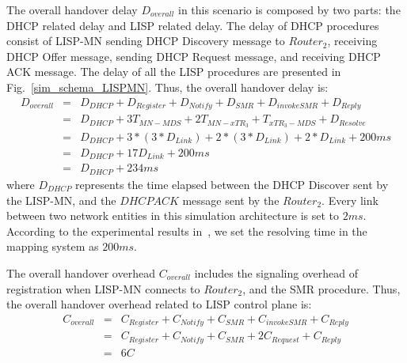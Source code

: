 The overall handover delay $D_{overall}$ in this scenario is composed by two parts: the DHCP related delay and LISP related delay. The delay of DHCP procedures consist of LISP-MN sending DHCP Discovery message to $Router_2$, receiving DHCP Offer message, sending DHCP Request message, and receiving DHCP ACK message. The delay of all the LISP procedures are presented in Fig.~\ref{sim_schema_LISPMN}. Thus, the overall handover delay is:
\begin{eqnarray}
D_{overall} &=& D_{DHCP} + D_{Register} + D_{Notify} + D_{SMR} + D_{invokeSMR} + D_{Reply} \nonumber \\
&=& D_{DHCP} + 3T_{MN-MDS} + 2T_{MN-xTR_3} + T_{xTR_3-MDS} + D_{Resolve} \nonumber \\
&=& D_{DHCP} + 3* (3*D_{Link}) + 2*(3*D_{Link}) + 2*D_{Link} + 200ms\nonumber \\
&=& D_{DHCP} + 17D_{Link} + 200 ms  \\
&=& D_{DHCP} + 234 ms \nonumber
\end{eqnarray}
where $D_{DHCP}$ represents the time elapsed between the DHCP Discover sent by the LISP-MN, and the $DHCP ACK$ message sent by the $Router_2$. Every link between two network entities in this simulation architecture is set to $2 ms$. According to the experimental results in~\cite{coras2014performance}, we set the resolving time in the mapping system as $200 ms$. %

The overall handover overhead $C_{overall}$ includes the signaling overhead of registration when LISP-MN connects to $Router_2$, and the SMR procedure. Thus, the overall handover overhead related to LISP control plane is:
\begin{eqnarray}
C_{overall} &=& C_{Register} + C_{Notify} + C_{SMR} + C_{invokeSMR} + C_{Reply} \nonumber \\
&=& C_{Register} + C_{Notify} + C_{SMR} + 2C_{Request} + C_{Reply} \nonumber \\
&=& 6 C
\end{eqnarray}

